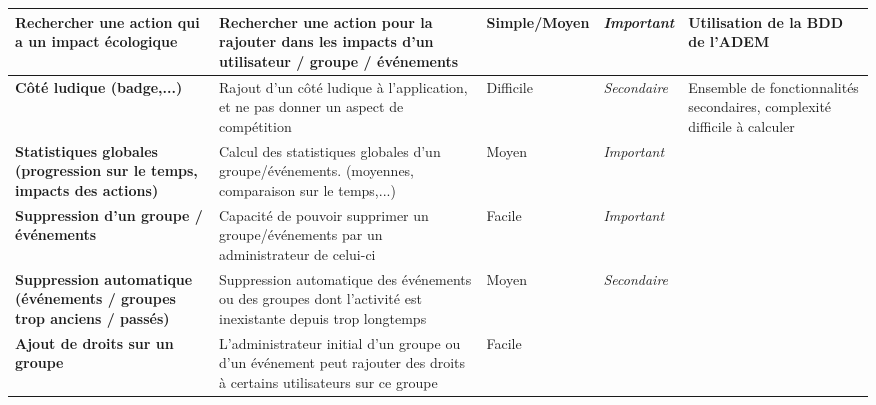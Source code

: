 \begin{table}[h]
    \centering
    \begin{tabularx}{\textwidth}{|X|X|X|X|X|}
    \hline
    \textbf{Rechercher une action qui a un impact écologique} & Rechercher une action pour la rajouter dans les impacts d'un utilisateur / groupe / événements & Simple/Moyen & \textit{Important} & Utilisation de la BDD de l'ADEM \\
    \hline
    \textbf{Côté ludique (badge,...)} & Rajout d'un côté ludique à l'application, et ne pas donner un aspect de compétition & Difficile & \textit{Secondaire} & Ensemble de fonctionnalités secondaires, complexité difficile à calculer \\
    \hline
    \textbf{Statistiques globales (progression sur le temps, impacts des actions)} & Calcul des statistiques globales d'un groupe/événements. (moyennes, comparaison sur le temps,...) & Moyen & \textit{Important} & \\
    \hline
    \textbf{Suppression d'un groupe / événements} & Capacité de pouvoir supprimer un groupe/événements par un administrateur de celui-ci & Facile & \textit{Important} & \\
    \hline
    \textbf{Suppression automatique (événements / groupes trop anciens / passés)} & Suppression automatique des événements ou des groupes dont l'activité est inexistante depuis trop longtemps & Moyen & \textit{Secondaire} & \\
    \hline
    \textbf{Ajout de droits sur un groupe} & L'administrateur initial d'un groupe ou d'un événement peut rajouter des droits à certains utilisateurs sur ce groupe & Facile &  & \\
    \hline
\end{tabularx}
\end{table}

\newpage 
